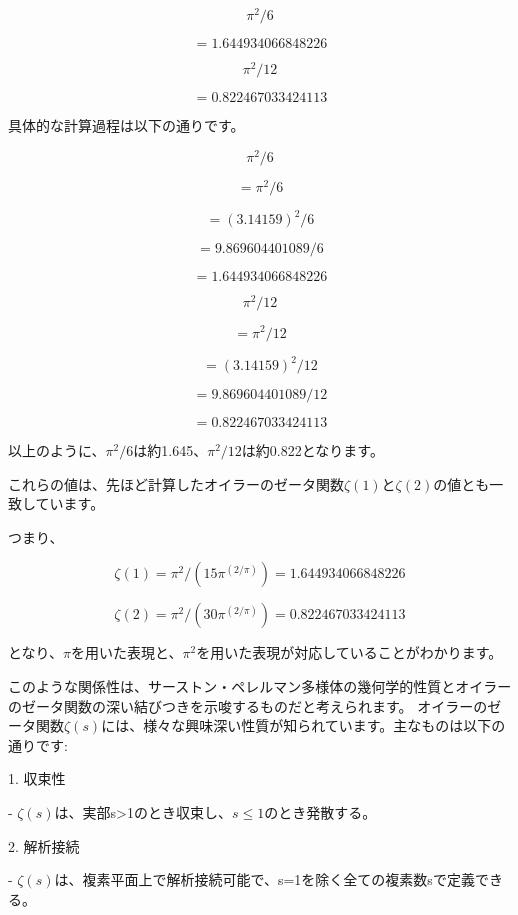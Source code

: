 \documentclass{jsarticle}
\begin{document}
$${\pi^2 / 6}$$

$$= 1.644934066848226$$



$${\pi^2 / 12} $$

$$= 0.822467033424113$$



具体的な計算過程は以下の通りです。



$${\pi^2 / 6}$$

$$= \pi^2 / 6$$

$$= (3.14159)^2 / 6$$

$$= 9.869604401089 / 6$$

$$= 1.644934066848226$$



$${\pi^2 / 12}$$

$$= \pi^2 / 12 $$

$$= (3.14159)^2 / 12$$

$$= 9.869604401089 / 12$$

$$= 0.822467033424113$$



以上のように、${\pi^2 / 6}$は約1.645、${\pi^2 / 12}$は約0.822となります。



これらの値は、先ほど計算したオイラーのゼータ関数$\zeta(1)$と$\zeta(2)$の値とも一致しています。



つまり、



$$\zeta(1) = \pi^2 / (15\pi^{(2/\pi)}) = 1.644934066848226 $$

$$\zeta(2) = \pi^2 / (30\pi^{(2/\pi)}) = 0.822467033424113$$



となり、$\pi$を用いた表現と、$\pi^2$を用いた表現が対応していることがわかります。



このような関係性は、サーストン・ペレルマン多様体の幾何学的性質とオイラーのゼータ関数の深い結びつきを示唆するものだと考えられます。
オイラーのゼータ関数$\zeta(s)$には、様々な興味深い性質が知られています。主なものは以下の通りです:



1. 収束性

   - $\zeta(s)$は、実部s>1のとき収束し、$s\le 1$のとき発散する。



2. 解析接続

   - $\zeta(s)$は、複素平面上で解析接続可能で、s=1を除く全ての複素数sで定義できる。
\end{document}
